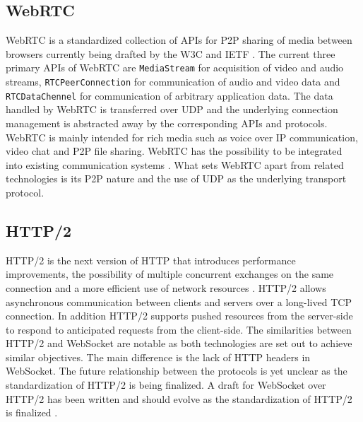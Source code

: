 \subsection{WebRTC}

WebRTC is a standardized collection of APIs for P2P sharing of media between browsers currently being drafted by the W3C and IETF \cite{bergkvist2012webrtc,alvestrand2014overview}. The current three primary APIs of WebRTC are \texttt{MediaStream} for acquisition of video and audio streams, \texttt{RTCPeerConnection} for communication of audio and video data and \texttt{RTCDataChennel} for communication of arbitrary application data. The data handled by WebRTC is transferred over UDP and the underlying connection management is abstracted away by the corresponding APIs and protocols. WebRTC is mainly intended for rich media such as voice over IP communication, video chat and P2P file sharing. WebRTC has the possibility to be integrated into existing communication systems \cite{johnston2013taking}. What sets WebRTC apart from related technologies is its P2P nature and the use of UDP as the underlying transport protocol.

\subsection{HTTP/2}

HTTP/2 is the next version of HTTP that introduces performance improvements, the possibility of multiple concurrent exchanges on the same connection and a more efficient use of network resources \cite{belshe2014hypertext}. HTTP/2 allows asynchronous communication between clients and servers over a long-lived TCP connection. In addition HTTP/2 supports pushed resources from the server-side to respond to anticipated requests from the client-side. The similarities between HTTP/2 and WebSocket are notable as both technologies are set out to achieve similar objectives. The main difference is the lack of HTTP headers in WebSocket. The future relationship between the protocols is yet unclear as the standardization of HTTP/2 is being finalized. A draft for WebSocket over HTTP/2 has been written and should evolve as the standardization of HTTP/2 is finalized \cite{hirano2014websocketoverhttp2}.